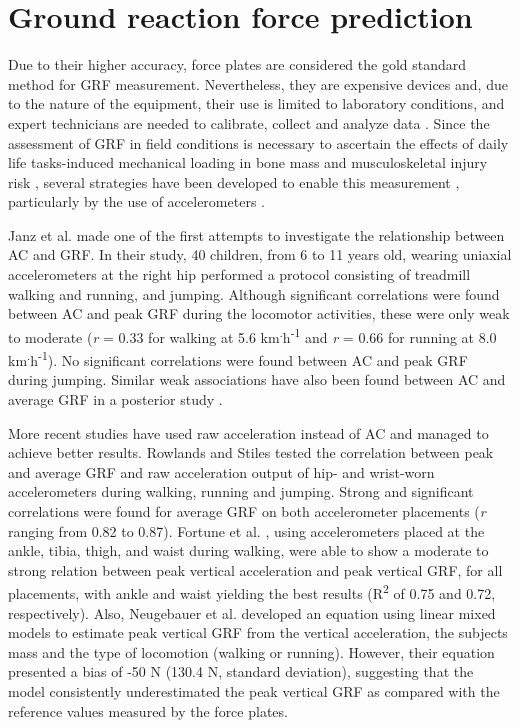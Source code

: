 \documentclass[12pt]{article}
\begin{document}
\section*{Ground reaction force prediction}

Due to their higher accuracy, force plates are considered the gold standard method for GRF measurement. Nevertheless, they are expensive devices and, due to the nature of the equipment, their use is limited to laboratory conditions, and expert technicians are needed to calibrate, collect and analyze data . Since the assessment of GRF in field conditions is necessary to ascertain the effects of daily life tasks-induced mechanical loading in bone mass and musculoskeletal injury risk , several strategies have been developed to enable this measurement , particularly by the use of accelerometers .

Janz et al.  made one of the first attempts to investigate the relationship between AC and GRF. In their study, 40 children, from 6 to 11 years old, wearing uniaxial accelerometers at the right hip performed a protocol consisting of treadmill walking and running, and jumping. Although significant correlations were found between AC and peak GRF during the locomotor activities, these were only weak to moderate (\textit{r} = 0.33 for walking at  5.6 km\textsuperscript{.}h\textsuperscript{-1} and \textit{r} = 0.66 for running at 8.0 km\textsuperscript{.}h\textsuperscript{-1}). No significant correlations were found between AC and peak GRF during jumping. Similar weak associations have also been found between AC and average GRF in a posterior study .

More recent studies have used raw acceleration instead of AC and managed to achieve better results. Rowlands and Stiles  tested the correlation between peak and average GRF and raw acceleration output of hip- and wrist-worn accelerometers during walking, running and jumping. Strong and significant correlations were found for average GRF on both accelerometer placements (\textit{r} ranging from 0.82 to 0.87). Fortune et al. , using accelerometers placed at the ankle, tibia, thigh, and waist during walking, were able to show a moderate to strong relation between peak vertical acceleration and peak vertical GRF, for all placements, with ankle and waist yielding the best results (R\textsuperscript{2} of 0.75 and 0.72, respectively). Also, Neugebauer et al.  developed an equation using linear mixed models to estimate peak vertical GRF from the vertical acceleration, the subjects mass and the type of locomotion (walking or running). However, their equation presented a bias of -50 N (130.4 N, standard deviation), suggesting that the model consistently underestimated the peak vertical GRF as compared with the reference values measured by the force plates.
\end{document}
